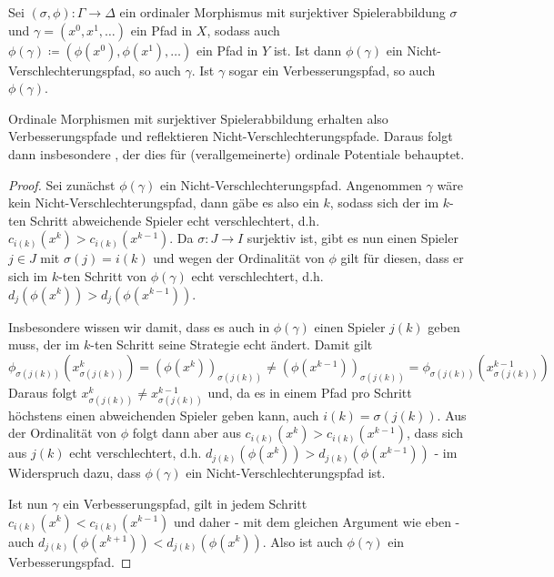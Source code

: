 \begin{prop}\label{prop:NVReflVerbErh}
	Sei $(\sigma, \phi): \Gamma \to \Delta$ ein ordinaler Morphismus mit surjektiver Spielerabbildung $\sigma$ und $\gamma = (x^0, x^1, \dots)$ ein Pfad in $X$, sodass auch $\phi(\gamma) \coloneqq (\phi(x^0), \phi(x^1), \dots)$ ein Pfad in $Y$ ist. Ist dann $\phi(\gamma)$ ein Nicht-Verschlechterungspfad, so auch $\gamma$. Ist $\gamma$ sogar ein Verbesserungspfad, so auch $\phi(\gamma)$.
\end{prop}

Ordinale Morphismen mit surjektiver Spielerabbildung erhalten also Verbesserungspfade und reflektieren Nicht-Verschlechterungspfade. Daraus folgt dann insbesondere , der dies für (verallgemeinerte) ordinale Potentiale behauptet.

\begin{proof}
	Sei zunächst $\phi(\gamma)$ ein Nicht-Verschlechterungspfad. Angenommen $\gamma$ wäre kein Nicht-Verschlechterungspfad, dann gäbe es also ein $k$, sodass sich der im $k$-ten Schritt abweichende Spieler echt verschlechtert, d.h. $c_{i(k)}(x^k) > c_{i(k)}(x^{k-1})$. Da $\sigma: J \to I$ surjektiv ist, gibt es nun einen Spieler $j \in J$ mit $\sigma(j) = i(k)$ und wegen der Ordinalität von $\phi$ gilt für diesen, dass er sich im $k$-ten Schritt von $\phi(\gamma)$ echt verschlechtert, d.h. $d_j(\phi(x^k)) > d_j(\phi(x^{k-1}))$. 
	
	Insbesondere wissen wir damit, dass es auch in $\phi(\gamma)$ einen Spieler $j(k)$ geben muss, der im $k$-ten Schritt seine Strategie echt ändert. Damit gilt
		\[\phi_{\sigma(j(k))}\left(x_{\sigma(j(k))}^k\right) = \left(\phi(x^k)\right)_{\sigma(j(k))} \neq \left(\phi(x^{k-1})\right)_{\sigma(j(k))} = \phi_{\sigma(j(k))}\left(x_{\sigma(j(k))}^{k-1}\right)\]
	Daraus folgt $x_{\sigma(j(k))}^k \neq x_{\sigma(j(k))}^{k-1}$ und, da es in einem Pfad pro Schritt höchstens einen abweichenden Spieler geben kann, auch $i(k) = \sigma(j(k))$. Aus der Ordinalität von $\phi$ folgt dann aber aus $c_{i(k)}(x^k) > c_{i(k)}(x^{k-1})$, dass sich aus $j(k)$ echt verschlechtert, d.h. $d_{j(k)}(\phi(x^k)) > d_{j(k)}(\phi(x^{k-1}))$ - im Widerspruch dazu, dass $\phi(\gamma)$ ein Nicht-Verschlechterungspfad ist.

	Ist nun $\gamma$ ein Verbesserungspfad, gilt in jedem Schritt $c_{i(k)}(x^{k}) < c_{i(k)}(x^{k-1})$ und daher - mit dem gleichen Argument wie eben - auch $d_{j(k)}(\phi(x^{k+1})) < d_{j(k)}(\phi(x^k))$. Also ist auch $\phi(\gamma)$ ein Verbesserungspfad.
\end{proof}

